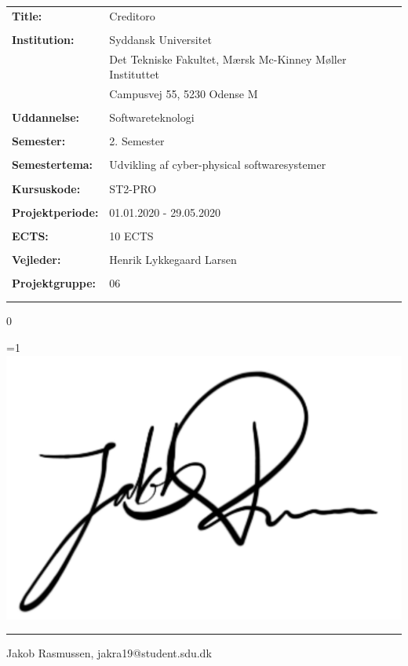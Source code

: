 \noindent
\begin{tabular}{@{}l l} 
\textbf{Title:} & Creditoro \\
& \\
\textbf{Institution:} & Syddansk Universitet \\
& Det Tekniske Fakultet, Mærsk Mc-Kinney Møller Instituttet \\
& Campusvej 55, 5230 Odense M \\
& \\
\textbf{Uddannelse:} & Softwareteknologi \\
& \\
\textbf{Semester:} & 2. Semester \\
& \\
\textbf{Semestertema:} & Udvikling af cyber-physical softwaresystemer \\
& \\
\textbf{Kursuskode:} & ST2-PRO \\
& \\
\textbf{Projektperiode:} &  01.01.2020 - 29.05.2020\\
& \\
\textbf{ECTS:} & 10 ECTS\\
& \\
\textbf{Vejleder:} & Henrik Lykkegaard Larsen\\
& \\
\textbf{Projektgruppe:} & 06\\
& \\

\\
\end{tabular}

\setcounter{PROD} {0}



\ifnum \value{PROD}=1
    \includegraphics[scale=0.07]{figures/signatures/signatureJR.jpg}
    \vspace{-9.5mm}
\fi
\par\noindent\rule{\textwidth}{0.4pt}
\noindent
Jakob Rasmussen, jakra19@student.sdu.dk\\

